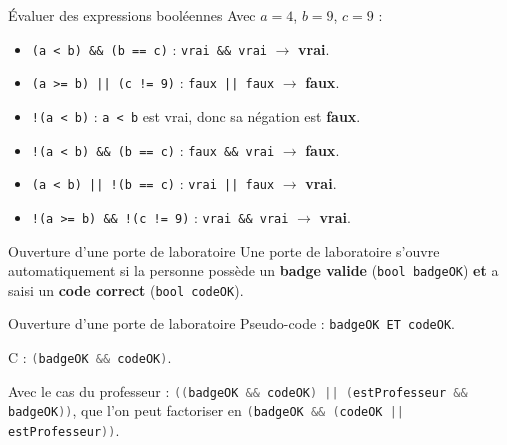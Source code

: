 \begin{UPSTIprofOnlyEnv}
    \begin{UPSTIcorrectionP}{Évaluer des expressions booléennes}
        Avec $a=4$, $b=9$, $c=9$ :
        \begin{itemize}
            \item \verb|(a < b) && (b == c)| : \texttt{vrai \&\& vrai} $\to$ \textbf{vrai}.
            \item \verb$(a >= b) || (c != 9)$ : \texttt{faux || faux} $\to$ \textbf{faux}.
            \item \verb|!(a < b)| : \texttt{a < b} est vrai, donc sa négation est \textbf{faux}.
            \item \verb|!(a < b) && (b == c)| : \texttt{faux \&\& vrai} $\to$ \textbf{faux}.
            \item \verb$(a < b) || !(b == c)$ : \texttt{vrai || faux} $\to$ \textbf{vrai}.
            \item \verb$!(a >= b) && !(c != 9)$ : \texttt{vrai \&\& vrai} $\to$ \textbf{vrai}.
        \end{itemize}
    \end{UPSTIcorrectionP}
\end{UPSTIprofOnlyEnv}


\begin{UPSTIexercice}{Ouverture d'une porte de laboratoire}
    Une porte de laboratoire s'ouvre automatiquement si la personne possède un \textbf{badge valide} (\texttt{bool badgeOK}) \textbf{et} a saisi un \textbf{code correct} (\texttt{bool codeOK}).
\end{UPSTIexercice}

\begin{UPSTIprofOnlyEnv}
    \begin{UPSTIcorrectionP}{Ouverture d'une porte de laboratoire}
        Pseudo-code : \verb|badgeOK ET codeOK|.

        C : \lstinline[language=C]{(badgeOK && codeOK)}.

        Avec le cas du professeur : \lstinline[language=C]{((badgeOK && codeOK) || (estProfesseur && badgeOK))}, que l'on peut factoriser en \lstinline[language=C]{(badgeOK && (codeOK || estProfesseur))}.
    \end{UPSTIcorrectionP}
\end{UPSTIprofOnlyEnv}


